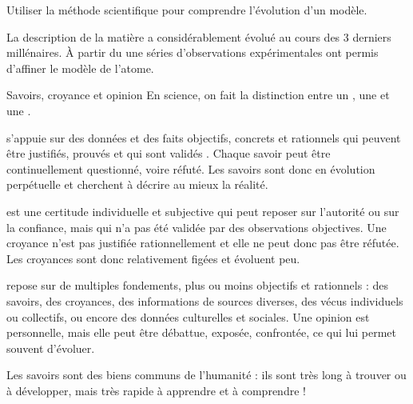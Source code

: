 \teteSndAtom


\begin{objectifs}
  \item Utiliser la méthode scientifique pour comprendre l'évolution d'un modèle.
\end{objectifs}

\begin{contexte}
  La description de la matière a considérablement évolué au cours des 3 derniers millénaires.
  À partir du  une séries d'observations expérimentales ont permis d'affiner le modèle de l'atome.
  
\end{contexte}


\begin{doc}{Savoirs, croyance et opinion}
  En science, on fait la distinction entre un , une  et une .

  \begin{listePoints}
    \item
     s'appuie sur des données et des faits objectifs, concrets et rationnels qui peuvent être justifiés, prouvés et qui sont validés .
    Chaque savoir peut être continuellement questionné, voire réfuté.
    Les savoirs sont donc en évolution perpétuelle et cherchent à décrire au mieux la réalité.
 
    \item 
     est une certitude individuelle et subjective qui peut reposer sur l'autorité ou sur la confiance, mais qui n'a pas été validée par des observations objectives.
    Une croyance n'est pas justifiée rationnellement et elle ne peut donc pas être réfutée.
    Les croyances sont donc relativement figées et évoluent peu.
  
    \item
     repose sur de multiples fondements, plus ou moins objectifs et rationnels : des savoirs, des croyances, des informations de sources diverses, des vécus individuels ou collectifs, ou encore des données culturelles et sociales.
    Une opinion est personnelle, mais elle peut être débattue, exposée, confrontée, ce qui lui permet souvent d'évoluer.
  \end{listePoints}

  Les savoirs sont des biens communs de l'humanité : ils sont très long à trouver ou à développer, mais très rapide à apprendre et à comprendre !
\end{doc}


